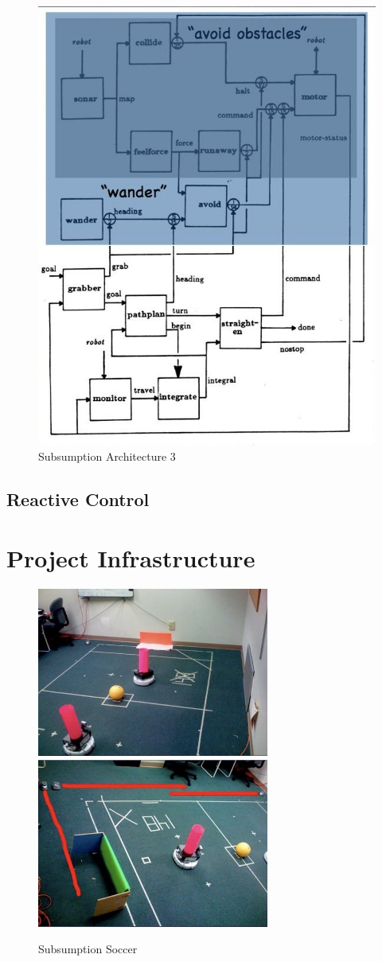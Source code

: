 \begin{figure}[!h]
\centering
\includegraphics[width=0.5\columnwidth]{figures/9_sub4.jpg}
\caption{Subsumption Architecture 3}
\end{figure}

\subsection{Reactive Control}

\section{Project Infrastructure}

\begin{figure}
\centerline{
\mbox{\includegraphics[width=3.00in]{figures/9_soccer1.jpg}}
\mbox{\includegraphics[width=3.00in]{figures/9_soccer2.jpg}}
}
\caption{Subsumption Soccer}
\end{figure}


